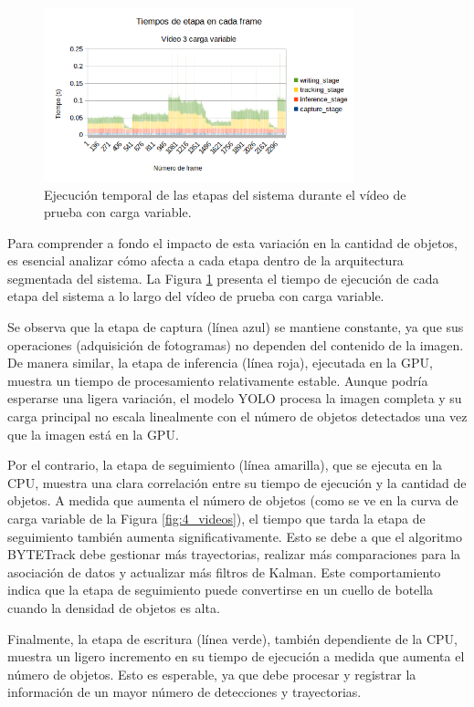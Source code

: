 \documentclass[11pt,spanish,listoffigures,listoftables]{tfgetsinf}
\begin{document}
\begin{figure}[H]
   \centering
   \includegraphics[width=0.8\textwidth]{images/analisis_de_la_solucion/tiempos_etapa.png}
   \caption{Ejecución temporal de las etapas del sistema durante el vídeo de prueba con carga variable.}
   \label{fig:tiempos_etapa}
\end{figure}

Para comprender a fondo el impacto de esta variación en la cantidad de objetos, es esencial analizar cómo afecta a cada etapa dentro de la arquitectura segmentada del sistema. La Figura \ref{fig:tiempos_etapa} presenta el tiempo de ejecución de cada etapa del sistema a lo largo del vídeo de prueba con carga variable.

Se observa que la etapa de captura (línea azul) se mantiene constante, ya que sus operaciones (adquisición de fotogramas) no dependen del contenido de la imagen. De manera similar, la etapa de inferencia (línea roja), ejecutada en la GPU, muestra un tiempo de procesamiento relativamente estable. Aunque podría esperarse una ligera variación, el modelo YOLO procesa la imagen completa y su carga principal no escala linealmente con el número de objetos detectados una vez que la imagen está en la GPU.

Por el contrario, la etapa de seguimiento (línea amarilla), que se ejecuta en la CPU, muestra una clara correlación entre su tiempo de ejecución y la cantidad de objetos. A medida que aumenta el número de objetos (como se ve en la curva de carga variable de la Figura \ref{fig:4_videos}), el tiempo que tarda la etapa de seguimiento también aumenta significativamente. Esto se debe a que el algoritmo BYTETrack debe gestionar más trayectorias, realizar más comparaciones para la asociación de datos y actualizar más filtros de Kalman. Este comportamiento indica que la etapa de seguimiento puede convertirse en un cuello de botella cuando la densidad de objetos es alta.

Finalmente, la etapa de escritura (línea verde), también dependiente de la CPU, muestra un ligero incremento en su tiempo de ejecución a medida que aumenta el número de objetos. Esto es esperable, ya que debe procesar y registrar la información de un mayor número de detecciones y trayectorias.
\end{document}
